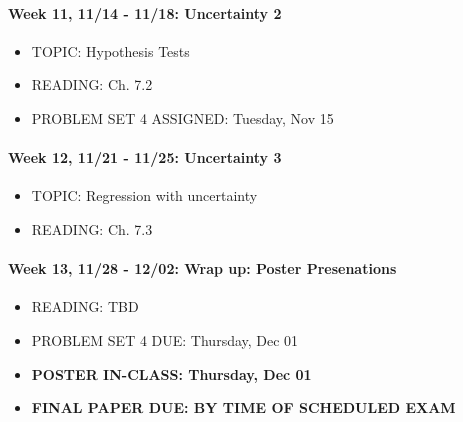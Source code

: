 \documentclass[11pt,]{article}
\begin{document}
\paragraph{Week 11, 11/14 - 11/18: Uncertainty
2}\label{week-11-1114---1118-uncertainty-2}

\begin{itemize}
\itemsep1pt\parskip0pt
\item
  TOPIC: Hypothesis Tests
\item
  READING: Ch. 7.2
\item
  PROBLEM SET 4 ASSIGNED: Tuesday, Nov 15
\end{itemize}

\paragraph{Week 12, 11/21 - 11/25: Uncertainty
3}\label{week-12-1121---1125-uncertainty-3}

\begin{itemize}
\itemsep1pt\parskip0pt
\item
  TOPIC: Regression with uncertainty
\item
  READING: Ch. 7.3
\end{itemize}

\paragraph{Week 13, 11/28 - 12/02: Wrap up: Poster
Presenations}\label{week-13-1128---1202-wrap-up-poster-presenations}

\begin{itemize}
\itemsep1pt\parskip0pt
\item
  READING: TBD
\item
  PROBLEM SET 4 DUE: Thursday, Dec 01
\item
  \textbf{POSTER IN-CLASS: Thursday, Dec 01}
\item
  \textbf{FINAL PAPER DUE: BY TIME OF SCHEDULED EXAM}
\end{itemize}
\end{document}
